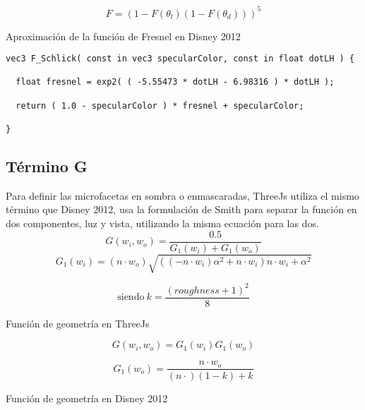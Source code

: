   \begin{eqfloat}[!htb]
    \begin{equation}
      F= (1 - F(\theta_l) (1 - F(\theta_d)))^5
    \end{equation}
  \caption{Aproximaci\'on de la funci\'on de Fresnel en Disney 2012}
  \end{eqfloat}

  \begin{lstlisting}[caption=Implementaci\'on en ThreeJs de la aproximaci\'on a la funci\'on de Fresnel]
vec3 F_Schlick( const in vec3 specularColor, const in float dotLH ) {

  float fresnel = exp2( ( -5.55473 * dotLH - 6.98316 ) * dotLH );

  return ( 1.0 - specularColor ) * fresnel + specularColor;

}
  \end{lstlisting}

  \subsection*{T\'ermino G}
  Para definir las microfacetas en sombra o enmascaradas, ThreeJs utiliza el mismo t\'ermino que Disney 2012, usa
  la formulaci\'on de Smith para separar la funci\'on en dos componentes, luz y vista, utilizando la misma ecuaci\'on
  para las dos.\\

  $$
  G(w_i, w_o) = \frac{0.5}{G_1(w_i) + G_1(w_o)}
  $$
  \singlespacing
  $$
  G_1(w_i) = (n \cdot{w_o}) \sqrt{((-n\cdot{w_i}) \alpha^2 + n\cdot{w_i}) n\cdot{w_i} + \alpha^2}
  $$
  \begin{eqfloat}[!htb]
    \begin{equation}
      \textrm{siendo}\ k = \frac{(roughness + 1)^2}{8}
    \end{equation}
  \caption{Funci\'on de geometr\'ia en ThreeJs}
  \end{eqfloat}
  \singlespacing

  $$
  G(w_i, w_o) = G_1(w_i)G_1(w_o)
  $$

  \begin{eqfloat}[!htb]
    \begin{equation}
      G_1(w_o) = \frac{n\cdot{w_o}}{(n\cdot) (1 - k) + k}
    \end{equation}
  \caption{Funci\'on de geometr\'ia en Disney 2012}
  \end{eqfloat}
  \singlespacing

